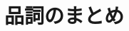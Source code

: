 \documentclass[aspectratio=169,xcolor={dvipsnames,table}]{beamer}
\begin{document}
%
%
\section{品詞のまとめ}
\end{document}
